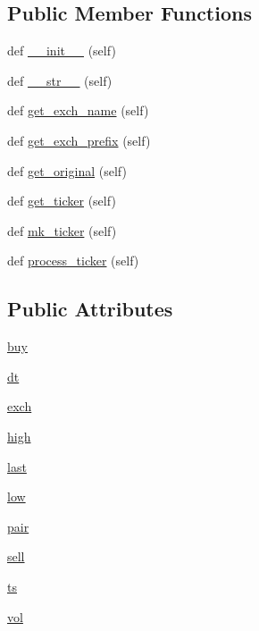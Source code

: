 \subsection*{Public Member Functions}
\begin{DoxyCompactItemize}
\item 
def \hyperlink{classexchange_1_1_ok_coin_ad3023a05231b37239fc5e2b220e2ae4c}{\+\_\+\+\_\+init\+\_\+\+\_\+} (self)
\item 
def \hyperlink{classexchange_1_1_ok_coin_af726894627f12bc46d199de5f454f2f4}{\+\_\+\+\_\+str\+\_\+\+\_\+} (self)
\item 
def \hyperlink{classexchange_1_1_ok_coin_a4bf45f3a1e9711ae38fd2eb01965e1d0}{get\+\_\+exch\+\_\+name} (self)
\item 
def \hyperlink{classexchange_1_1_ok_coin_a0ea57ae94a5e07e9387f830c67ceeed1}{get\+\_\+exch\+\_\+prefix} (self)
\item 
def \hyperlink{classexchange_1_1_ok_coin_aa1c262dbfc2f3e2c0339fadd68ece144}{get\+\_\+original} (self)
\item 
def \hyperlink{classexchange_1_1_ok_coin_a35425d16f4e0eb64677e32443fb4d91c}{get\+\_\+ticker} (self)
\item 
def \hyperlink{classexchange_1_1_ok_coin_a5a24006154b66792398302f2e6509578}{mk\+\_\+ticker} (self)
\item 
def \hyperlink{classexchange_1_1_ok_coin_ac3ae7a770ea55b1b52ff0d909182d387}{process\+\_\+ticker} (self)
\end{DoxyCompactItemize}
\subsection*{Public Attributes}
\begin{DoxyCompactItemize}
\item 
\hyperlink{classexchange_1_1_ok_coin_aaf828e37142a83cbfb12d193313f6d43}{buy}
\item 
\hyperlink{classexchange_1_1_ok_coin_ade9d7cddcfa54f2b1ba5452854bfd48b}{dt}
\item 
\hyperlink{classexchange_1_1_ok_coin_a22678c192b53ddf34e8a636e0cdaf4d4}{exch}
\item 
\hyperlink{classexchange_1_1_ok_coin_af9d9dbcfc86404510e7f9a5704e8eecd}{high}
\item 
\hyperlink{classexchange_1_1_ok_coin_a726afbe3a75835fdcbe523aed8d6763c}{last}
\item 
\hyperlink{classexchange_1_1_ok_coin_a1afa53e0ad63830d0585288abea42094}{low}
\item 
\hyperlink{classexchange_1_1_ok_coin_a52f3b919f86565518d46c49c5b8f66a6}{pair}
\item 
\hyperlink{classexchange_1_1_ok_coin_aadb487d2e2f277374a747e1bcb0bd40b}{sell}
\item 
\hyperlink{classexchange_1_1_ok_coin_a0fe6263a7f58a6fa8a688929976b7e4a}{ts}
\item 
\hyperlink{classexchange_1_1_ok_coin_ad0e78d6b3c0a24504be72a0216fc6549}{vol}
\end{DoxyCompactItemize}
